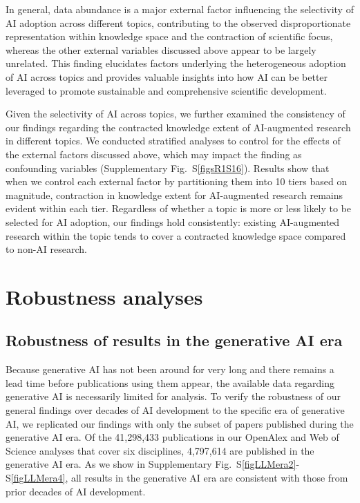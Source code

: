 In general, data abundance is a major external factor influencing the selectivity of AI adoption across different topics, contributing to the observed disproportionate representation within knowledge space and the contraction of scientific focus, whereas the other external variables discussed above appear to be largely unrelated.
This finding elucidates factors underlying the heterogeneous adoption of AI across topics and provides valuable insights into how AI can be better leveraged to promote sustainable and comprehensive scientific development.

Given the selectivity of AI across topics, we further examined the consistency of our findings regarding the contracted knowledge extent of AI-augmented research in different topics.
We conducted stratified analyses to control for the effects of the external factors discussed above, which may impact the finding as confounding variables (Supplementary Fig.~S\ref{figsR1S16}).
Results show that when we control each external factor by partitioning them into 10 tiers based on magnitude, contraction in knowledge extent for AI-augmented research remains evident within each tier. Regardless of whether a topic is more or less likely to be selected for AI adoption, our findings hold consistently: existing AI-augmented research within the topic tends to cover a contracted knowledge space compared to non-AI research.



\section{Robustness analyses}
\subsection{Robustness of results in the generative AI era}
Because generative AI has not been around for very long and there remains a lead time before publications using them appear, the available data regarding generative AI is necessarily limited for analysis.
To verify the robustness of our general findings over decades of AI development to the specific era of generative AI, we replicated our findings with only the subset of papers published during the generative AI era.
Of the 41,298,433 publications in our OpenAlex and Web of Science analyses that cover six disciplines, 4,797,614 are published in the generative AI era.
As we show in Supplementary Fig.~S\ref{figLLMera2}-S\ref{figLLMera4}, all results in the generative AI era are consistent with those from prior decades of AI development.

